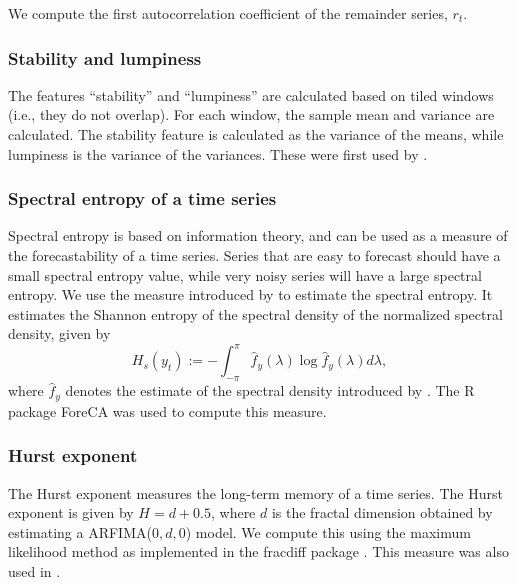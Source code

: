 \documentclass[11pt,a4paper,]{article}
\begin{document}
We compute the first autocorrelation coefficient of the remainder series, \(r_t\).

\hypertarget{stability-and-lumpiness}{%
\subsubsection*{Stability and lumpiness}\label{stability-and-lumpiness}}

The features ``stability'' and ``lumpiness'' are calculated based on tiled windows (i.e., they do not overlap). For each window, the sample mean and variance are calculated. The stability feature is calculated as the variance of the means, while lumpiness is the variance of the variances. These were first used by \textcite{hyndman2015large}.

\hypertarget{spectral-entropy-of-a-time-series}{%
\subsubsection*{Spectral entropy of a time series}\label{spectral-entropy-of-a-time-series}}

Spectral entropy is based on information theory, and can be used as a measure of the forecastability of a time series. Series that are easy to forecast should have a small spectral entropy value, while very noisy series will have a large spectral entropy. We use the measure introduced by \textcite{goerg2013forecastable} to estimate the spectral entropy. It estimates the Shannon entropy of the spectral density of the normalized spectral density, given by
\[
  H_{s}(y_t):=-\int_{-\pi}^{\pi}\hat f_y(\lambda)\log \hat f_y({\lambda})d\lambda,
\]
where \(\hat{f}_y\) denotes the estimate of the spectral density introduced by \textcite{nuttall1982spectral}. The R package ForeCA \autocite{Foreca} was used to compute this measure.

\hypertarget{hurst-exponent}{%
\subsubsection*{Hurst exponent}\label{hurst-exponent}}

The Hurst exponent measures the long-term memory of a time series. The Hurst exponent is given by \(H=d+0.5\), where \(d\) is the fractal dimension obtained by estimating a ARFIMA(\(0, d, 0\)) model. We compute this using the maximum likelihood method \autocite{haslett1989space} as implemented in the fracdiff package \autocite{fracdiff}. This measure was also used in \textcite{wang2009rule}.
\end{document}
